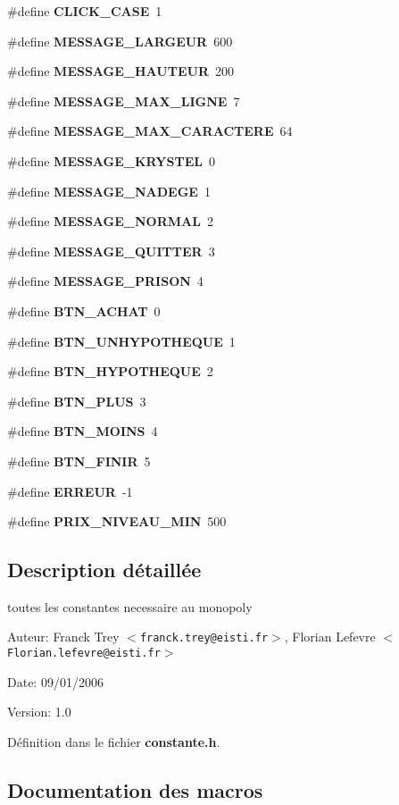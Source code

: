 \begin{CompactItemize}
\#define {\bf CLICK\_\-CASE}~1
\item 
\#define {\bf MESSAGE\_\-LARGEUR}~600
\item 
\#define {\bf MESSAGE\_\-HAUTEUR}~200
\item 
\#define {\bf MESSAGE\_\-MAX\_\-LIGNE}~7
\item 
\#define {\bf MESSAGE\_\-MAX\_\-CARACTERE}~64
\item 
\#define {\bf MESSAGE\_\-KRYSTEL}~0
\item 
\#define {\bf MESSAGE\_\-NADEGE}~1
\item 
\#define {\bf MESSAGE\_\-NORMAL}~2
\item 
\#define {\bf MESSAGE\_\-QUITTER}~3
\item 
\#define {\bf MESSAGE\_\-PRISON}~4
\item 
\#define {\bf BTN\_\-ACHAT}~0
\item 
\#define {\bf BTN\_\-UNHYPOTHEQUE}~1
\item 
\#define {\bf BTN\_\-HYPOTHEQUE}~2
\item 
\#define {\bf BTN\_\-PLUS}~3
\item 
\#define {\bf BTN\_\-MOINS}~4
\item 
\#define {\bf BTN\_\-FINIR}~5
\item 
\#define {\bf ERREUR}~-1
\item 
\#define {\bf PRIX\_\-NIVEAU\_\-MIN}~500
\end{CompactItemize}


\subsection{Description d\'{e}taill\'{e}e}
toutes les constantes necessaire au monopoly 

\begin{Desc}
\item[Auteur:]Franck Trey $<${\tt franck.trey@eisti.fr}$>$, Florian Lefevre $<${\tt Florian.lefevre@eisti.fr}$>$ \end{Desc}
\begin{Desc}
\item[Date:]09/01/2006 \end{Desc}
\begin{Desc}
\item[Version:]1.0 \end{Desc}


D\'{e}finition dans le fichier {\bf constante.h}.

\subsection{Documentation des macros}
